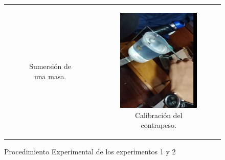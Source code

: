 \documentclass[../main.tex]{subfiles}
\begin{document}
\begin{figure}[H]
\begin{tabular}{c c}
\begin{subfigure}{0.4\linewidth}
            \caption{Sumersión de una masa.}
            \label{fig:proc3}
        \end{subfigure}&
        \begin{subfigure}{0.4\linewidth}
            \centering
            \includegraphics[width=0.4\linewidth]{resources/proc4.jpg}
            \caption{Calibración del contrapeso.}
            \label{fig:proc4}
        \end{subfigure}\\
    \end{tabular}
    \caption{Procedimiento Experimental de los experimentos 1 y 2}
    \label{fig:proc_exps}
\end{figure}
\end{document}
